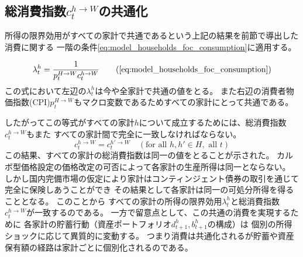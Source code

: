 \subsection{総消費指数\(c_t^{h\to W}\)の共通化}
\label{sec:model_risk_sharing_consumption_commonality}
所得の限界効用がすべての家計で共通であるという上記の結果を前節で導出した消費に関する
一階の条件\eqref{eq:model_households_foc_consumption}に適用する。

\begin{equation}
\lambda_t^h=\frac{1}{p_t^{H\to W}c_t^{h\to W}}\tag{\ref{eq:model_households_foc_consumption}}
\label{eq:model_risk_sharing_consumption_commonality_foc_restated}
\end{equation}
この式において左辺の\(\lambda_t^h\)は今や全家計で共通の値をとる。
また右辺の消費者物価指数(CPI)\(p_t^{H\to W}\)もマクロ変数であるためすべての家計にとって共通である。

したがってこの等式がすべての家計\(h\)について成立するためには、総消費指数\(c_t^{h\to W}\)もまた
すべての家計間で完全に一致しなければならない。
\begin{equation}
c_t^{h\to W}=c_t^{h'\to W}\quad(\text{for all }h,h'\in H,\text{ all }t)
\label{eq:model_risk_sharing_consumption_commonality_result}
\end{equation}
この結果、すべての家計の総消費指数は同一の値をとることが示された。
カルボ型価格設定の価格改定の可否によって各家計の生産所得は同一とならない。
しかし国内完備市場の仮定により家計はコンティンジェント債券の取引を通じて完全に保険しあうことができ
その結果として各家計は同一の可処分所得を得ることとなる。
このことから
すべての家計の所得の限界効用\(\lambda_t^h\)と総消費指数\(c_t^{h\to W}\)が一致するのである。
一方で留意点として、この共通の消費を実現するために
各家計の貯蓄行動（資産ポートフォリオ\(d_{t+1}^h,b_{t+1}^h\)の構成）は
個別の所得ショックに応じて異質的に変動する。
つまり消費は共通化されるが貯蓄や資産保有額の経路は家計ごとに個別化されるのである。